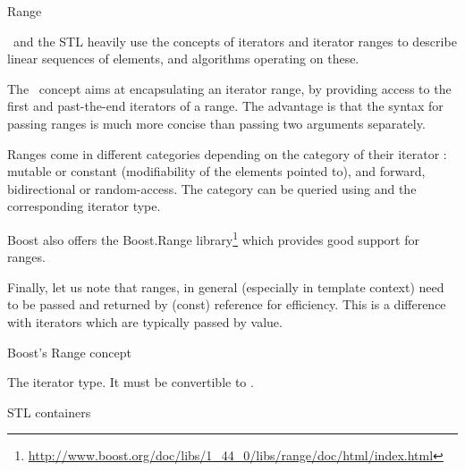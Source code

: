 \begin{ccRefConcept}{Range}

\ccDefinition

\cgal\ and the STL heavily use the concepts of iterators and iterator ranges
to describe linear sequences of elements, and algorithms operating on these.

The \ccRefName\ concept aims at encapsulating an iterator range, by providing
access to the first and past-the-end iterators of a range.  The advantage is
that the syntax for passing ranges is much more concise than passing two
arguments separately.


Ranges come in different categories depending on the category of their iterator :
mutable or constant (modifiability of the elements pointed to), and forward,
bidirectional or random-access.  The category can be queried using
 and the corresponding iterator type.

Boost also offers the Boost.Range
library\footnote{\url{http://www.boost.org/doc/libs/1_44_0/libs/range/doc/html/index.html}}
which provides good support for ranges.

Finally, let us note that ranges, in general (especially in template context)
need to be passed and returned by (const) reference for efficiency.  This is a
difference with iterators which are typically passed by value.

\ccRefines


Boost's Range concept

{}  %

\ccTypes

 {The iterator type.  It must be convertible to .}


\def\ccTagRmTrailingConst{\ccFalse}

\ccGlue
{}

\def\ccTagRmTrailingConst{\ccTrue}

\ccHasModels
STL containers\\

\end{ccRefConcept}
